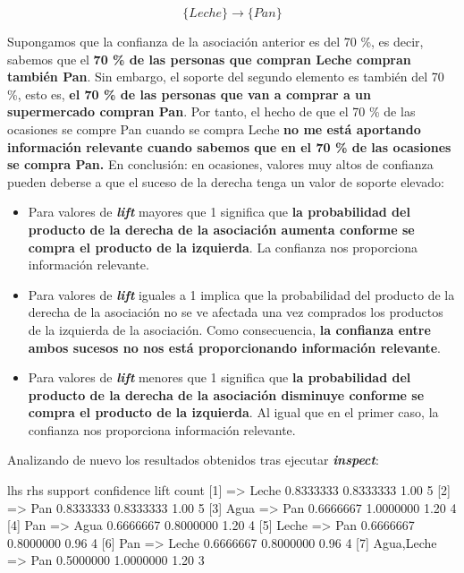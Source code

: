 \documentclass [a4paper] {article}
\begin{document}
\hfil  \begin{equation*} \{Leche\} \rightarrow \{Pan\} \end{equation*} \par \leavevmode
\newpage
Supongamos que la confianza de la asociación anterior es del 70 \%, es decir, sabemos que el \textbf{70 \% de las personas que compran Leche 
compran también Pan}. Sin embargo, el soporte del segundo elemento es también del 70 \%, esto es, \textbf{el 70 \% de las personas que van a 
comprar a un supermercado compran Pan}. Por tanto, el hecho de que el 70 \% de las ocasiones se compre Pan cuando se compra Leche 
\textbf{no me está aportando información relevante cuando sabemos que en el 70 \% de las ocasiones se compra Pan.} 
En conclusión: en ocasiones, valores muy altos de confianza pueden deberse a que el suceso de la derecha tenga un valor de soporte elevado:

\begin{itemize}
    \item Para valores de \textbf{\textit{lift}} mayores que 1 significa que \textbf{la probabilidad del producto de la derecha de la 
	      asociación aumenta conforme se compra el producto de la izquierda}. La confianza nos proporciona información relevante.
    \item Para valores de \textbf{\textit{lift}} iguales a 1 implica que la probabilidad del producto de la derecha de la asociación 
	      no se ve afectada una vez comprados los productos de la izquierda de la asociación. Como consecuencia,
		  \textbf{la confianza entre ambos sucesos no nos está proporcionando información relevante}.
    \item Para valores de \textbf{\textit{lift}} menores que 1 significa que \textbf{la probabilidad del producto de la derecha de la asociación
          disminuye conforme se compra el producto de la izquierda}. Al igual que en el primer caso, la confianza nos proporciona información relevante.
\end{itemize}

Analizando de nuevo los resultados obtenidos tras ejecutar \textbf{\textit{inspect}}:
\begin{Schunk}
\begin{Soutput}
    lhs             rhs     support   confidence lift count
[1] {}           => {Leche} 0.8333333 0.8333333  1.00 5    
[2] {}           => {Pan}   0.8333333 0.8333333  1.00 5    
[3] {Agua}       => {Pan}   0.6666667 1.0000000  1.20 4    
[4] {Pan}        => {Agua}  0.6666667 0.8000000  1.20 4    
[5] {Leche}      => {Pan}   0.6666667 0.8000000  0.96 4    
[6] {Pan}        => {Leche} 0.6666667 0.8000000  0.96 4    
[7] {Agua,Leche} => {Pan}   0.5000000 1.0000000  1.20 3    
\end{Soutput}
\end{Schunk}
\end{document}

